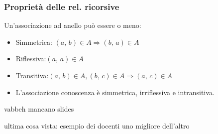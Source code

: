 \subsubsection{Proprietà delle rel. ricorsive}
Un'associazione ad anello può essere o meno:
\begin{itemize}
    \item Simmetrica: $(a,\, b) \in A \Rightarrow (b,\, a) \in A$
    \item Riflessiva:$(a,\, a) \in A$
    \item Transitiva:$(a,\, b) \in A,  (b,\, c) \in A \Rightarrow (a,\, c) \in A$
    \item L'associazione conoscenza è simmetrica, irriflessiva e intransitiva.
\end{itemize}


vabbeh mancano slides

ultima cosa vista: esempio dei docenti uno migliore dell'altro